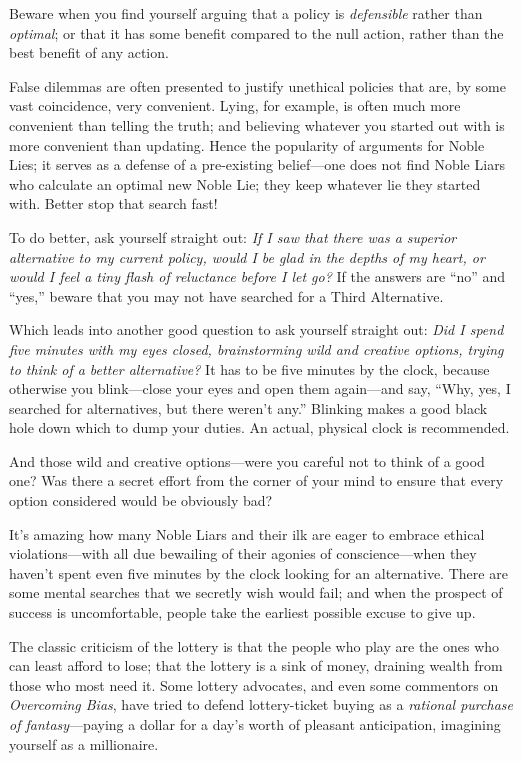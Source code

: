 {
 Beware when you find yourself arguing that a policy is
\textit{defensible} rather than \textit{optimal}; or that it has some
benefit compared to the null action, rather than the best benefit of
any action.}

{
 False dilemmas are often presented to justify unethical policies
that are, by some vast coincidence, very convenient. Lying, for
example, is often much more convenient than telling the truth; and
believing whatever you started out with is more convenient than
updating. Hence the popularity of arguments for Noble Lies; it serves
as a defense of a pre-existing belief---one does not find Noble Liars
who calculate an optimal new Noble Lie; they keep whatever lie they
started with. Better stop that search fast!}

{
 To do better, ask yourself straight out: \textit{If I saw that
there was a superior alternative to my current policy, would I be glad
in the depths of my heart, or would I feel a tiny flash of reluctance
before I let go?} If the answers are
``no'' and
``yes,'' beware that you may not
have searched for a Third Alternative.}

{
 Which leads into another good question to ask yourself straight
out: \textit{Did I spend five minutes with my eyes closed,
brainstorming wild and creative options, trying to think of a better
alternative?} It has to be five minutes by the clock, because otherwise
you blink---close your eyes and open them again---and say,
``Why, yes, I searched for alternatives, but there
weren't any.'' Blinking makes a good
black hole down which to dump your duties. An actual, physical clock is
recommended.}

{
 And those wild and creative options---were you careful not to
think of a good one? Was there a secret effort from the corner of your
mind to ensure that every option considered would be obviously bad?}

{
 It's amazing how many Noble Liars and their ilk
are eager to embrace ethical violations---with all due bewailing of
their agonies of conscience---when they haven't spent
even five minutes by the clock looking for an alternative. There are
some mental searches that we secretly wish would fail; and when the
prospect of success is uncomfortable, people take the earliest possible
excuse to give up.}

\myendsectiontext



{
 The classic criticism of the lottery is that the people who play
are the ones who can least afford to lose; that the lottery is a sink
of money, draining wealth from those who most need it. Some lottery
advocates, and even some commentors on \textit{Overcoming Bias}, have
tried to defend lottery-ticket buying as a \textit{rational purchase of
fantasy}{}---paying a dollar for a day's worth of
pleasant anticipation, imagining yourself as a millionaire. }

